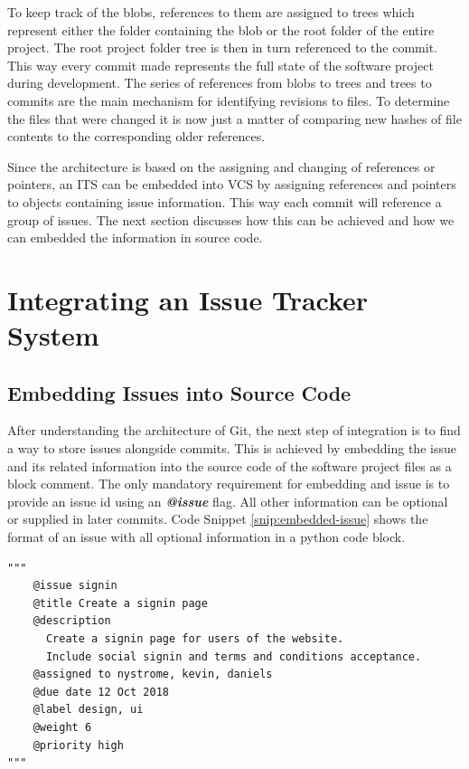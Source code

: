 \documentclass{mproj}
\newenvironment{code}{\captionsetup{type=listing}}{}
\begin{document}
To keep track of the blobs, references to them are assigned to trees which represent either the folder containing the blob or the root folder of the entire project.  The root project folder tree is then in turn referenced to the commit. This way every commit made represents the full state of the software project during development. The series of references from blobs to trees and trees to commits are the main mechanism for identifying revisions to files. To determine the files that were changed it is now just a matter of comparing new hashes of file contents to the corresponding older references.

Since the architecture is based on the assigning and changing of references or pointers, an ITS can be embedded into VCS by assigning references and pointers to objects containing issue information. This way each commit will reference a group of issues. The next section discusses how this can be achieved and how we can embedded the information in source code.





\section{Integrating an Issue Tracker System}


\subsection{Embedding Issues into Source Code}

After understanding the architecture of Git, the next step of integration is to find a way to store issues alongside commits. This is achieved by embedding the issue and its related information into the source code of the software project files as a block comment. The only mandatory requirement for embedding and issue is to provide an issue id using an \textbf{\textit{@issue}} flag. All other information can be optional or supplied in later commits. Code Snippet \ref{snip:embedded-issue} shows the format of an issue with all optional information in a python code block.

\begin{code}
\label{snip:embedded-issue}
\begin{verbatim}
"""
    @issue signin
    @title Create a signin page
    @description
      Create a signin page for users of the website. 
      Include social signin and terms and conditions acceptance.
    @assigned to nystrome, kevin, daniels
    @due date 12 Oct 2018
    @label design, ui
    @weight 6
    @priority high    
"""
\end{verbatim}
\end{code}
\end{document}
